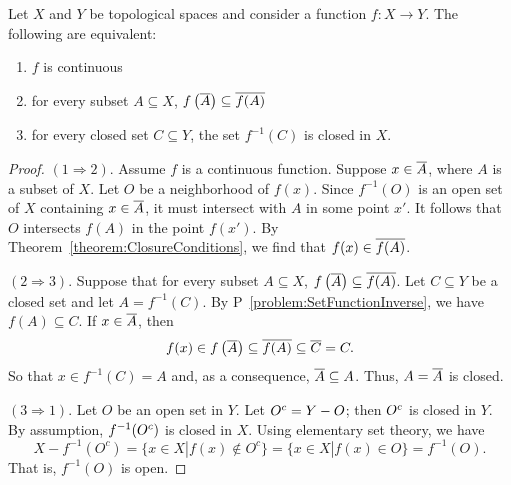\begin{theorem} \label{theorem:ContinuityEquivalentConditions}
Let $X$ and $Y$ be topological spaces and consider a function $f: X \rightarrow Y$.
The following are equivalent:
\begin{enumerate}
\item $f$ is continuous
\item for every subset $A \subseteq X$, $f \left( \overline{A} \right) \subseteq \overline{ f(A) }$
\item for every closed set $C \subseteq Y$, the set $f^{-1} (C)$ is closed in $X$.
\end{enumerate}
\end{theorem}
\begin{proof}
$(1 \Rightarrow 2)$.
Assume $f$ is a continuous function.
Suppose $x \in \overline{A}$, where $A$ is a subset of $X$.
Let $O$ be a neighborhood of $f(x)$.
Since $f^{-1}(O)$ is an open set of $X$ containing $x\in \overline{A}$, it must intersect with $A$ in some point $x'$.
It follows that $O$ intersects $f(A)$ in the point $f(x')$.
By Theorem~\ref{theorem:ClosureConditions}, we find that $f(x) \in \overline{ f(A) }$.

$(2 \Rightarrow 3)$.
Suppose that for every subset $A \subseteq X$, $f \left( \overline{A} \right) \subseteq \overline{ f(A) }$.
Let $C \subseteq Y$ be a closed set and let $A = f^{-1} (C)$.
By P~\ref{problem:SetFunctionInverse}, we have $f(A) \subseteq C$.
If $x \in \overline{A}$, then
\begin{equation*}
f(x) \in f \left( \overline{A} \right) \subseteq \overline{f (A)} \subseteq \overline{C} = C.
\end{equation*}
So that $x \in f^{-1} (C) = A$ and, as a consequence, $\overline{A} \subseteq A$.
Thus, $A = \overline{A}$ is closed.

$(3 \Rightarrow 1)$.
Let $O$ be an open set in $Y$.
Let ${O}^{c} = Y - O$; then ${O}^{c}$ is closed in $Y$.
By assumption, $f^{-1} ({O}^{c})$ is closed in $X$.
Using elementary set theory, we have
\begin{equation*}
X - f^{-1}(O^c) = \{ x\in X | f(x) \notin O^c \} = \{ x \in X | f(x) \in O \} = f^{-1} (O).
\end{equation*}
That is, $f^{-1} (O)$ is open.
\end{proof}

